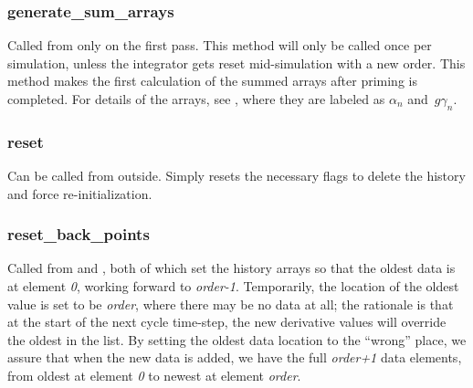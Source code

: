 \subsubsection{generate\_sum\_arrays}\label{ref:GJ_generate_sum_arrays}

Called from 
only on the first
pass. This method will only be called once per simulation, unless the
integrator gets reset mid-simulation with a new order.
This method makes the first calculation
of the summed arrays after priming is completed. For details of the arrays, see
, where they are labeled as $\alpha_n$ 
and~$g\gamma_n$.


\subsubsection{reset}\label{ref:GJ_reset}

Can be called from outside. Simply resets the necessary flags to
delete the history and force re-initialization.

\subsubsection{reset\_back\_points}\label{ref:GJ_reset_back_points}

Called from  and 
,
both of which set the history arrays so that the oldest data is at
element \textit{0}, working forward to \textit{order-1}. Temporarily,
the location of the oldest value is set to be \textit{order}, where
there may be no data at all; the rationale is that at the start of the
next cycle time-step, the new derivative values will override the
oldest in the list. By setting the oldest data location to the
``wrong'' place, we assure that when
the new data is added, we have the full \textit{order+1} data elements,
from oldest at element \textit{0} to newest at element \textit{order}.


